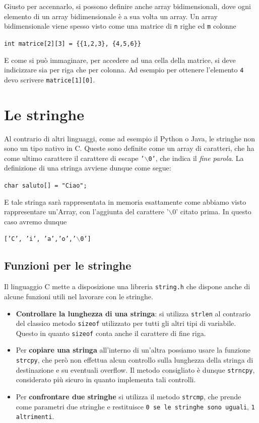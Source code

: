 \documentclass[12pt]{report}
\begin{document}
	Giusto per accennarlo, si possono definire anche array bidimensionali, dove ogni elemento di un array bidimensionale è a sua volta un array. Un array bidimensionale viene spesso visto come una matrice di \texttt{n} righe ed \texttt{m} colonne
	\begin{center}
		\texttt{int matrice[2][3] = \{\{1,2,3\}, \{4,5,6\}\}}
	\end{center}
	E come si può immaginare, per accedere ad una cella della matrice, si deve indicizzare sia per riga che per colonna. Ad esempio per ottenere l'elemento \texttt{4} devo scrivere \texttt{matrice[1][0]}.
	
	\section{Le stringhe}
	Al contrario di altri linguaggi, come ad esempio il Python o Java, le stringhe non sono un tipo nativo in C.
	Queste sono definite come un array di caratteri, che ha come ultimo carattere il carattere di escape \texttt{'$\backslash$0'}, che indica il \textit{fine parola}.
	La definizione di una stringa avviene dunque come segue:
	\begin{center}
		\texttt{char saluto[] = "Ciao";}
	\end{center}
	E tale stringa sarà rappresentata in memoria esattamente come abbiamo visto rappresentare un'Array, con l'aggiunta del carattere '$\backslash$0' citato prima. In questo caso avremo dunque 
	\begin{center}
		\texttt{['C', 'i', 'a','o','$\backslash$0']}
	\end{center}
	
	\subsection{Funzioni per le stringhe}
	Il linguaggio C mette a disposizione una libreria \texttt{string.h} che dispone anche di alcune funzioni utili nel lavorare con le stringhe.
	
	\begin{itemize}
		\item \textbf{Controllare la lunghezza di una stringa}: si utilizza \texttt{strlen} al contrario del classico metodo \texttt{sizeof} utilizzato per tutti gli altri tipi di variabile. Questo in quanto \texttt{sizeof} conta anche il carattere di fine riga.
		
		\item Per \textbf{copiare una stringa} all'interno di un'altra possiamo usare la funzione \texttt{strcpy}, che però non effettua alcun controllo sulla lunghezza della stringa di destinazione e su eventuali overflow. Il metodo consigliato è dunque \texttt{strncpy}, considerato più sicuro in quanto implementa tali controlli.
		
		\item Per \textbf{confrontare due stringhe} si utilizza il metodo \texttt{strcmp}, che prende come parametri due stringhe e restituisce \texttt{0 se le stringhe sono uguali}, \texttt{1 altrimenti}.
	\end{itemize}
	
\end{document}
